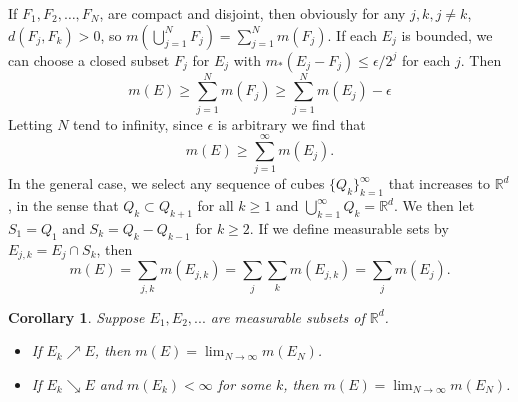 \documentclass[
]{book}
\providecommand{\tightlist}{%
  \setlength{\itemsep}{0pt}\setlength{\parskip}{0pt}}
\newtheorem{corollary}{Corollary}[chapter]
\theoremstyle{definition}
\theoremstyle{definition}
\theoremstyle{definition}
\theoremstyle{definition}
\theoremstyle{remark}
\begin{document}
If \(F_1,F_2,\dots, F_N\), are compact and disjoint, then obviously for any \(j,k,j\ne k\), \(d(F_j,F_k)>0\), so \(m\left(\bigcup_{j=1}^NF_j\right)=\sum_{j=1}^Nm(F_j)\). If each \(E_j\) is bounded, we can choose a closed subset \(F_j\) for \(E_j\) with \(m_{\ast}(E_j-F_j)\leq \epsilon/2^j\) for each \(j\). Then
\[
  m(E) \geq \sum_{j=1}^Nm(F_j) \ge \sum_{j=1}^Nm(E_j)-\epsilon
  \]
Letting \(N\) tend to infinity, since \(\epsilon\) is arbitrary we find that
\[
  m(E)\ge\sum_{j=1}^{\infty}m(E_j).
  \]
In the general case, we select any sequence of cubes \(\{Q_k\}_{k=1}^{\infty}\) that increases to \(\mathbb{R}^d\), in the sense that \(Q_k\subset Q_{k+1}\) for all \(k\ge 1\) and \(\bigcup_{k=1}^{\infty}Q_k=\mathbb{R}^d\). We then let \(S_1=Q_1\) and \(S_k=Q_k-Q_{k-1}\) for \(k\ge 2\). If we define measurable sets by \(E_{j,k}=E_j\cap S_k\), then
\[
  m(E) =\sum_{j,k}m(E_{j,k})=\sum_j\sum_km(E_{j,k})=\sum_jm(E_j).
  \]

\begin{corollary}

Suppose \(E_1,E_2,...\) are measurable subsets of \(\mathbb{R}^d\).

\begin{itemize}
\tightlist
\item
  If \(E_k \nearrow E\), then \(m(E) =\lim_{N\to \infty}m(E_N)\).
\item
  If \(E_k \searrow E\) and \(m(E_k)<\infty\) for some \(k\), then \(m(E) =\lim_{N\to \infty}m(E_N)\).
\end{itemize}

\end{corollary}
\end{document}
